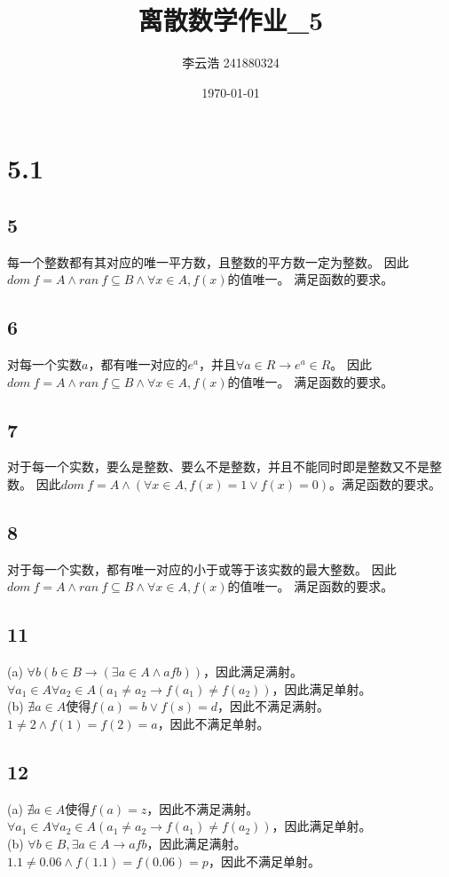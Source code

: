 \documentclass{article}
\title{离散数学作业\_5}
\author{李云浩 241880324}
\date{\today}
\begin{document}
\maketitle
\section{5.1}
\subsection{5}
每一个整数都有其对应的唯一平方数，且整数的平方数一定为整数。
因此$dom\ f = A \land ran\ f \subseteq B \land \forall x \in A, f(x)$的值唯一。
满足函数的要求。
\subsection{6}
对每一个实数$a$，都有唯一对应的$e^a$，并且$\forall a \in R \rightarrow e^a \in R$。
因此$dom\ f = A \land ran\ f \subseteq B \land \forall x \in A, f(x)$的值唯一。
满足函数的要求。
\subsection{7}
对于每一个实数，要么是整数、要么不是整数，并且不能同时即是整数又不是整数。
因此$dom\ f = A \land (\forall x \in A, f(x) = 1 \lor f(x) = 0)$。满足函数的要求。
\subsection{8}
对于每一个实数，都有唯一对应的小于或等于该实数的最大整数。
因此$dom\ f = A \land ran\ f \subseteq B \land \forall x \in A, f(x)$的值唯一。
满足函数的要求。
\subsection{11}
(a) $\forall b (b\in B \rightarrow (\exists a \in A \land afb))$，因此满足满射。\\
$\forall a_1 \in A \forall a_2 \in A(a_1 \neq a_2 \rightarrow f(a_1) \neq f(a_2))$，因此满足单射。\\
(b) $\nexists a \in A$使得$f(a) = b \lor f(s) = d$，因此不满足满射。\\
$1 \neq 2 \land f(1) = f(2) = a$，因此不满足单射。\\
\subsection{12}
(a) $\nexists a \in A$使得$f(a) = z$，因此不满足满射。\\
$\forall a_1 \in A \forall a_2 \in A(a_1 \neq a_2 \rightarrow f(a_1) \neq f(a_2))$，因此满足单射。\\
(b) $\forall b \in B, \exists a \in A \rightarrow afb$，因此满足满射。\\
$1.1 \neq 0.06 \land f(1.1) = f(0.06) = p$，因此不满足单射。\\
\end{document}

